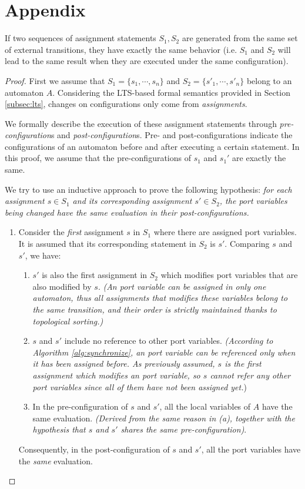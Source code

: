 \section*{Appendix}

\setcounter{theorem}{0}
\begin{theorem} If two sequences of assignment statements $S_1, S_2$ are generated from the same set of external transitions, they have exactly the same behavior (i.e. $S_1$ and $S_2$ will lead to the same result when they are executed under the same configuration).
\end{theorem}
\begin{proof}
    First we assume that $S_1=\{s_1,\cdots,s_n\}$ and $S_2=\{s'_1,\cdots,s'_n\}$ belong to an automaton $A$.
    Considering the LTS-based formal semantics provided in Section \ref{subsec:lts}, changes on configurations only come from \emph{assignments}. 
    
    We formally describe the execution of these assignment statements through \emph{pre-configuration}s and \emph{post-configuration}s. Pre- and post-configurations indicate the configurations of an automaton before and after executing a certain statement. In this proof, we assume that the pre-configurations of $s_1$ and $s_1'$ are exactly the same.
    
    
    We try to use an inductive approach to prove the following hypothesis: \emph{for each assignment $s\in S_1$ and its corresponding assignment $s'\in S_2$, the port variables being changed have the same evaluation in their post-configurations.}
    \begin{enumerate}
        \item Consider the \emph{first} assignment $s$ in $S_1$ where there are assigned port variables. It is assumed that its corresponding statement in $S_2$ is $s'$. Comparing $s$ and $s'$, we have:
        \begin{enumerate}
            \item $s'$ is also the first assignment in $S_2$ which modifies port variables that are also modified by $s$.
            \emph{(An port variable can be assigned in only one automaton, thus all assignments that modifies these variables belong to the same transition, and their order is strictly maintained thanks to topological sorting.)}
            \item $s$ and $s'$ include no reference to other port variables. \emph{(According to Algorithm \ref{alg:synchronize}, an port variable can be referenced only when it has been assigned before. As previously assumed, $s$ is the first assignment which modifies an port variable, so $s$ cannot refer any other port variables since all of them have not been assigned yet.})
            \item In the pre-configuration of $s$ and $s'$, all the local variables of $A$ have the same evaluation. \emph{(Derived from the same reason in (a), together with the hypothesis that $s$ and $s'$ shares the same pre-configuration)}.
        \end{enumerate}
        Consequently, in the post-configuration of $s$ and $s'$, all the port variables have the \emph{same} evaluation.


\end{enumerate}
\end{proof}
